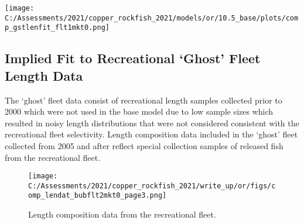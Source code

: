 \documentclass[11pt,
  english,
  a4paper,
]{article}
\begin{document}
\tagmcend\tagstructend


\texttt{[image: C:/Assessments/2021/copper\_rockfish\_2021/models/or/10.5\_base/plots/comp\_gstlenfit\_flt1mkt0.png]} \clearpage

\tagmcend\tagstructend


\hypertarget{append-rec}{%
\subsection{Implied Fit to Recreational `Ghost' Fleet Length Data}\label{append-rec}}

\leavevmode\tagmcend\tagstructend


The `ghost' fleet data consist of recreational length samples collected prior to 2000 which were not used in the base model due to low sample sizes which resulted in noisy length distributions that were not considered consistent with the recreational fleet selectivity. Length composition data included in the `ghost' fleet collected from 2005 and after reflect special collection samples of released fish from the recreational fleet.

\leavevmode\tagmcend\tagstructend\par


\begin{figure}
\centering
\texttt{[image: C:/Assessments/2021/copper\_rockfish\_2021/write\_up/or/figs/comp\_lendat\_bubflt2mkt0\_page3.png]}
\caption{Length composition data from the recreational fleet.\label{fig:ghost-rec-len-data}}
\end{figure}

\tagmcend\tagstructend

\end{document}
